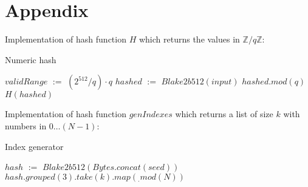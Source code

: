 \documentclass[]{article}
\def\Let#1#2{\State #1 $:=$ #2}
\begin{document}
    \section*{Appendix}
    \label{appendix}

    Implementation of hash function $H$ which returns the values in $\mathbb{Z}/q\mathbb{Z}$:

    \begin{algorithm}[H]
        \caption{Numeric hash}
        \label{alg:H}
        \begin{algorithmic}[1]
            \Let{$validRange$}{$(2^{512} / q) \cdot q$}
            \Let{$hashed$}{$Blake2b512(input)$}
            \State \Return $hashed.mod(q)$
            \Else
            \State \Return $H(hashed)$
            \EndIf
            \EndFunction
        \end{algorithmic}
    \end{algorithm}

    Implementation of hash function $genIndexes$ which returns a list of size $k$ with numbers in $0\dots (N-1)$:

    \begin{algorithm}[H]
        \caption{Index generator}
        \label{alg:genIndexes}
        \begin{algorithmic}[1]
                \Let{$hash$}{$Blake2b512(Bytes.concat(seed))$}
                \State \Return $hash.grouped(3).take(k).map(_.mod(N))$
            \EndFunction
        \end{algorithmic}
    \end{algorithm}
\end{document}
